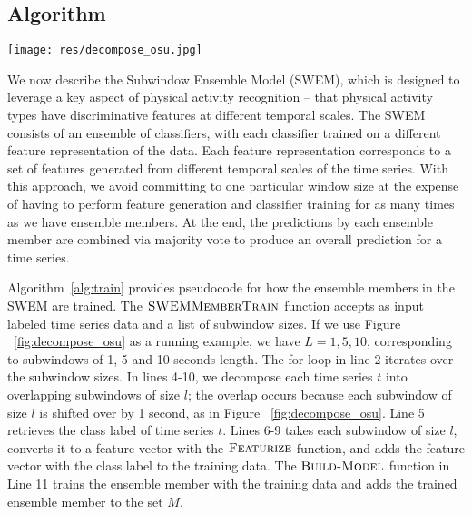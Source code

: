 \documentclass[letterpaper]{article}
\begin{document}
\subsection{Algorithm}
\begin{figure*}[t]
\centering
\texttt{[image: res/decompose\_osu.jpg]}
\caption{Decomposing a time series of a 10-second walk (shown on top) into 1, 5 and 10-second overlapping subwindows (shown on the bottom). The subwindows shift by 1 second. }
\label{fig:decompose_osu}
\end{figure*}


We now describe the Subwindow Ensemble Model (SWEM), which is designed to leverage a key aspect of physical activity recognition -- that physical activity types have discriminative features at different temporal scales. The SWEM consists of an ensemble of classifiers, with each classifier trained on a different feature representation of the data. Each feature representation corresponds to a set of features generated from different temporal scales of the time series. With this approach, we avoid committing to one particular window size at the expense of having to perform feature generation and classifier training for as many times as we have ensemble members. At the end, the predictions by each ensemble member are combined via majority vote to produce an overall prediction for a time series.

Algorithm~\ref{alg:train} provides pseudocode for how the ensemble members in the SWEM are trained. The $\textsc{SWEMMemberTrain}$ function accepts as input labeled time series data and a list of subwindow sizes. If we use Figure ~\ref{fig:decompose_osu} as a running example, we have $L = {1, 5, 10}$, corresponding to  subwindows of 1, 5 and 10 seconds length. The for loop in line 2 iterates over the subwindow sizes. In lines 4-10, we decompose each time series $t$ into overlapping subwindows of size $l$; the overlap occurs because each subwindow of size $l$ is shifted over by 1 second, as in Figure ~\ref{fig:decompose_osu}. Line 5 retrieves the class label of time series $t$. Lines 6-9 takes each subwindow of size $l$, converts it to a feature vector with the $\textsc{Featurize}$ function, and adds the feature vector with the class label to the training data. The $\textsc{Build-Model}$ function in Line 11 trains the ensemble member with the training data and adds the trained ensemble member to the set $M$.
\end{document}
